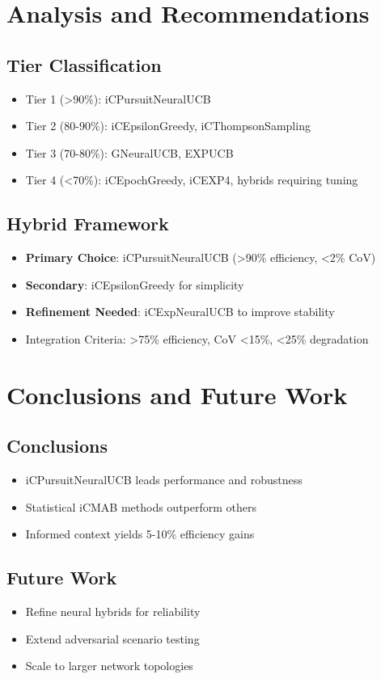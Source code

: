 \documentclass[12pt,a4paper]{article}
\newcommand{\primary}[1]{\textcolor{primaryblue}{\textbf{#1}}}
\newcommand{\secondary}[1]{\textcolor{secondaryblue}{\textbf{#1}}}
\newcommand{\warning}[1]{\textcolor{warningred}{\textbf{#1}}}
\newcommand{\highlight}[1]{\colorbox{highlightgray}{#1}}
\begin{document}
\section{Analysis and Recommendations}
\subsection{Tier Classification}

\begin{itemize}
\item Tier 1 (>90\%): iCPursuitNeuralUCB
\item Tier 2 (80-90\%): iCEpsilonGreedy, iCThompsonSampling
\item Tier 3 (70-80\%): GNeuralUCB, EXPUCB
\item Tier 4 (<70\%): iCEpochGreedy, iCEXP4, hybrids requiring tuning
\end{itemize}

\subsection{Hybrid Framework}

\begin{itemize}
\item \primary{Primary Choice}: iCPursuitNeuralUCB (>90\% efficiency, <2\% CoV)
\item \secondary{Secondary}: iCEpsilonGreedy for simplicity
\item \warning{Refinement Needed}: iCExpNeuralUCB to improve stability
\item \highlight{Integration Criteria}: >75\% efficiency, CoV <15\%, <25\% degradation
\end{itemize}

\section{Conclusions and Future Work}

\subsection{Conclusions}
\begin{itemize}
\item iCPursuitNeuralUCB leads performance and robustness
\item Statistical iCMAB methods outperform others
\item Informed context yields 5-10\% efficiency gains
\end{itemize}

\subsection{Future Work}
\begin{itemize}
\item Refine neural hybrids for reliability
\item Extend adversarial scenario testing
\item Scale to larger network topologies
\end{itemize}
\end{document}
